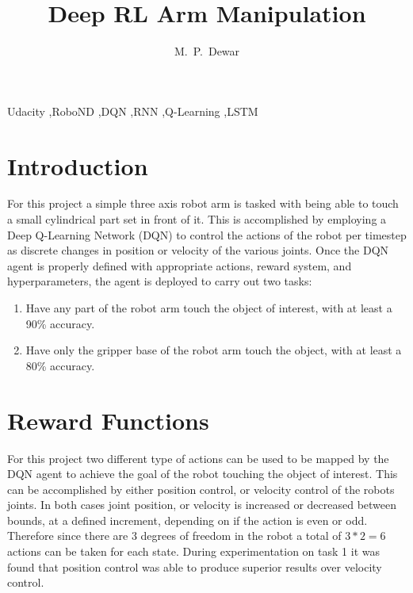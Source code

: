 \documentclass[1p, number, sort&compress,table, 11pt]{elsarticle}
\begin{document}
	\onehalfspacing
	
	\begin{frontmatter}
	
		\title{Deep RL Arm Manipulation}
		
		\author[MPD]{M.~P.~Dewar}
		
		
		\begin{keyword}
			Udacity \sep RoboND \sep DQN \sep RNN \sep Q-Learning \sep LSTM
		\end{keyword}

	\end{frontmatter}
	
	

	\section{Introduction}\label{sec:intro}
		

	For this project a simple three axis robot arm is tasked with being able to touch a small cylindrical part set in front of it. This is accomplished by employing a Deep Q-Learning Network (DQN) to control the actions of the robot per timestep as discrete changes in position or velocity of the various joints. Once the DQN agent is properly defined with appropriate actions, reward system, and hyperparameters, the agent is deployed to carry out two tasks:

	\begin{enumerate}
		\item Have any part of the robot arm touch the object of interest, with at least a 90\% accuracy.
		\item Have only the gripper base of the robot arm touch the object, with at least a 80\% accuracy.
	\end{enumerate}
	
	

	\section{Reward Functions}\label{sec:rewards}

	For this project two different type of actions can be used to be mapped by the DQN agent to achieve the goal of the robot touching the object of interest. This can be accomplished by either position control, or velocity control of the robots joints. In both cases joint position, or velocity is increased or decreased between bounds, at a defined increment, depending on if the action is even or odd. Therefore since there are 3 degrees of freedom in the robot a total of $3*2=6$ actions can be taken for each state. During experimentation on task 1 it was found that position control was able to produce superior results over velocity control.
\end{document}
